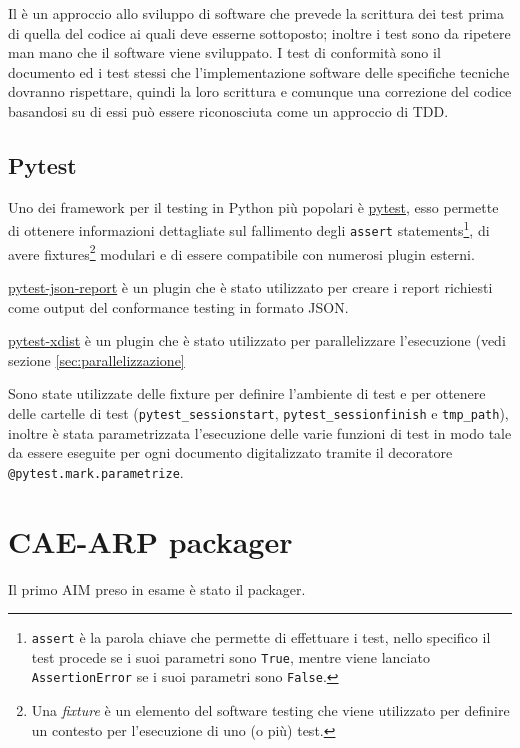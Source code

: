Il  è un approccio allo sviluppo di software che prevede la scrittura dei test prima di quella del codice ai quali deve esserne sottoposto; inoltre i test sono da ripetere man mano che il software viene sviluppato.
I test di conformità sono il documento ed i test stessi che l'implementazione software delle specifiche tecniche dovranno rispettare, quindi la loro scrittura e comunque una correzione del codice basandosi su di essi può essere riconosciuta come un approccio di \ac{TDD}. %


\subsection{Pytest} \label{ssec:pytest} %
Uno dei framework per il testing in Python più popolari è \href{https://pytest.org}{pytest}, esso permette di ottenere informazioni dettagliate sul fallimento degli \texttt{assert} statements\footnote{\texttt{assert} è la parola chiave che permette di effettuare i test, nello specifico il test procede se i suoi parametri sono \texttt{True}, mentre viene lanciato \texttt{AssertionError} se i suoi parametri sono \texttt{False}.}, di avere fixtures\footnote{Una \textit{fixture} è un elemento del software testing che viene utilizzato per definire un contesto per l'esecuzione di uno (o più) test.} modulari e di essere compatibile con numerosi plugin esterni.

\href{https://github.com/numirias/pytest-json-report}{pytest-json-report} è un plugin che è stato utilizzato per creare i report richiesti come output del conformance testing in formato JSON.

\href{https://pytest-xdist.readthedocs.io/}{pytest-xdist} è un plugin che è stato utilizzato per parallelizzare l'esecuzione (vedi sezione \ref{sec:parallelizzazione}

Sono state utilizzate delle fixture per definire l'ambiente di test e per ottenere delle cartelle di test (\verb|pytest_sessionstart|, \verb|pytest_sessionfinish| e \verb|tmp_path|), inoltre è stata parametrizzata l'esecuzione delle varie funzioni di test in modo tale da essere eseguite per ogni documento digitalizzato tramite il decoratore \texttt{@pytest.mark.parametrize}.


\section{\acs{CAE}-\acs{ARP} packager} \label{sec:test-packager}
Il primo \ac{AIM} preso in esame è stato il packager.

